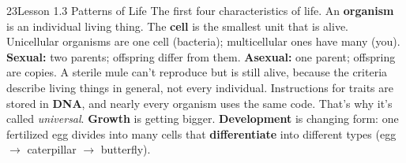 \documentclass[11pt,letterpaper]{article}
\begin{document}
\begin{tbpage}{23}{Lesson 1.3 Patterns of Life}
  {The first four characteristics of life.}
    {An \textbf{organism} is an individual living thing. The \textbf{cell} is the smallest unit that is alive. Unicellular organisms are one cell (bacteria); multicellular ones have many (you).}
    {\textbf{Sexual:} two parents; offspring differ from them. \textbf{Asexual:} one parent; offspring are copies. A sterile mule can't reproduce but is still alive, because the criteria describe living things in general, not every individual.}
    {Instructions for traits are stored in \textbf{DNA}, and nearly every organism uses the same code. That's why it's called \emph{universal}.}
    {\textbf{Growth} is getting bigger. \textbf{Development} is changing form: one fertilized egg divides into many cells that \textbf{differentiate} into different types (egg $\rightarrow$ caterpillar $\rightarrow$ butterfly).}
\end{tbpage}
\end{document}
